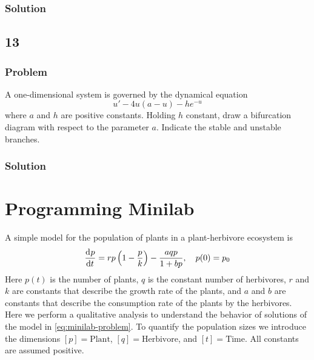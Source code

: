 \documentclass[12pt]{article}
\begin{document}
\subsubsection*{Solution}
\todo[]

\subsection{13}
\subsubsection*{Problem}
A one-dimensional system is governed by the dynamical equation
\begin{equation}
  \label{eq:13-problem}
  u'-4u(a-u)-he^{-u}
\end{equation}
where $a$ and $h$ are positive constants. Holding $h$ constant, draw a
bifurcation diagram with respect to the parameter $a$. Indicate the stable and
unstable branches.

\subsubsection*{Solution}
\todo[]

\newpage
\section{Programming Minilab}
A simple model for the population of plants in a plant-herbivore ecosystem is
\begin{equation}
  \label{eq:minilab-problem}
  \frac{\mathrm{d}^{} {p}}{\mathrm{d}{t}^{}} = rp\left( 1-\frac{p}{k} \right) - \frac{aqp}{1+bp}, \quad p(0)=p_0
\end{equation}
Here $p(t)$ is the number of plants, $q$ is the constant number of herbivores,
$r$ and $k$ are constants that describe the growth rate of the plants, and $a$
and $b$ are constants that describe the consumption rate of the plants by the
herbivores. Here we perform a qualitative analysis to understand the behavior of
solutions of the model in \cref{eq:minilab-problem}. To quantify the population
sizes we introduce the dimensions $[p] = \text{Plant}$, $[q] =
\text{Herbivore}$, and $[t] = \text{Time}$. All constants are assumed positive.
\end{document}
